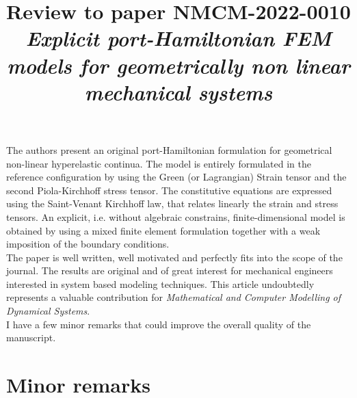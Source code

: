 \documentclass[a4paper, 10pt]{article}
\title{Review to paper NMCM-2022-0010\\
\textit{Explicit port-Hamiltonian FEM models for geometrically non linear mechanical systems}}
\date{}
\begin{document}
	\maketitle
	
	The authors present an original port-Hamiltonian formulation for geometrical non-linear hyperelastic continua. The model is entirely formulated in the reference configuration by using the Green (or Lagrangian) Strain tensor and the second Piola-Kirchhoff stress tensor.  The constitutive equations are expressed using the Saint-Venant Kirchhoff law, that relates linearly the strain and stress tensors.  An explicit, i.e. without algebraic constrains, finite-dimensional model is obtained by using a mixed finite element formulation together with a weak imposition of the boundary conditions. \\
	
	The paper is well written, well motivated and perfectly fits into the scope of the journal. The results are original and of great interest for mechanical engineers interested in system based modeling techniques. This article undoubtedly represents a valuable contribution for \textit{Mathematical and Computer Modelling of Dynamical Systems}. \\
	
	I have a few minor remarks that could improve the overall quality of the manuscript.
	
	
	\section{Minor remarks}
	
\end{document}
